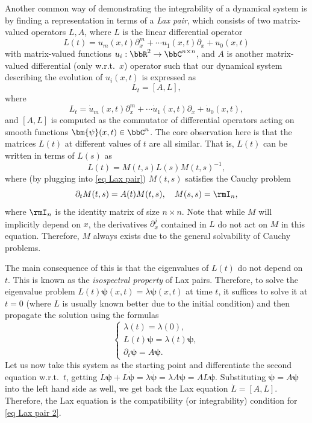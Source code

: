 \begin{example}\label{ex Lax pairs}
    Another common way of demonstrating the integrability of a dynamical system is by finding a representation in terms of a \emph{Lax pair}, which consists of two matrix-valued operators $L,A$, where $L$ is the linear differential operator
    \[L(t)=u_m(x,t)\partial_x^m+\cdots u_1(x,t)\partial_x+u_0(x,t)\]
    with matrix-valued functions $u_i:\bbR^2\to \bbC^{n\times n}$, and $A$ is another matrix-valued differential (only w.r.t.\ $x$) operator such that our dynamical system describing the evolution of $u_i(x,t)$ is expressed as 
    \[L_t=[A,L],\label{eq Lax pair}\]
    where 
    \[L_t=\dot u_m(x,t)\partial_x^m+\cdots \dot u_1(x,t)\partial_x+\dot u_0(x,t),\]
    and $[A,L]$ is computed as the commutator of differential operators acting on smooth functions $\bm{\psi}(x,t)\in\bbC^n$. The core observation here is that the matrices $L(t)$ at different values of $t$ are all similar. That is, $L(t)$ can be written in terms of $L(s)$ as 
    \[L(t)=M(t,s)L(s)M(t,s)^{-1},\]
    where (by plugging into \eqref{eq Lax pair}) $M(t,s)$ satisfies the Cauchy problem 
    \[\partial_t M(t,s)=A(t)M(t,s),\quad M(s,s)=\rmI_n,\]
    where $\rmI_n$ is the identity matrix of size $n\times n$.
    Note that while $M$ will implicitly depend on $x$, the derivatives $\partial_x^j$ contained in $L$ do not act on $M$ in this equation. Therefore, $M$ always exists due to the general solvability of Cauchy problems.

    The main consequence of this is that the eigenvalues of $L(t)$ do not depend on $t$. This is known as the \emph{isospectral property} of Lax pairs. Therefore, to solve the eigenvalue problem $L(t)\bm{\psi}(x,t)=\lambda\bm{\psi}(x,t)$ at time $t$, it suffices to solve it at $t=0$ (where $L$ is usually known better due to the initial condition) and then propagate the solution using the formulas
    \[\begin{cases}
        \lambda(t)=\lambda(0),\\
        L(t)\bm{\psi}=\lambda(t)\bm{\psi},\\
        \partial_t\bm{\psi}=A\bm{\psi}.
    \end{cases}\label{eq Lax pair 2}\]
    Let us now take this system as the starting point and differentiate the second equation w.r.t.\ $t$, getting $\dot L\bm{\psi}+L\dot{\bm{\psi}}=\lambda\dot{\bm{\psi}}=\lambda A\bm{\psi}=A L\bm{\psi}$. Substituting $\dot{\bm{\psi}}=A\bm{\psi}$ into the left hand side as well, we get back the Lax equation $\dot L=[A,L]$. Therefore, the Lax equation is the compatibility (or integrability) condition for \eqref{eq Lax pair 2}.


\end{example}

